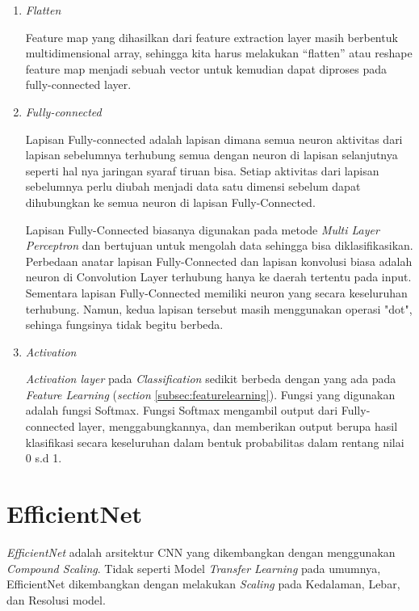\begin{enumerate}
	\item \textit{Flatten}
	
	Feature map yang dihasilkan dari feature extraction layer masih berbentuk multidimensional array, sehingga kita harus melakukan “flatten” atau reshape feature map menjadi sebuah vector untuk kemudian dapat diproses pada fully-connected layer.
	
	\item \textit{Fully-connected}
	
	Lapisan Fully-connected adalah lapisan dimana semua neuron aktivitas dari lapisan sebelumnya terhubung semua dengan neuron di lapisan selanjutnya seperti hal nya jaringan syaraf tiruan bisa. Setiap aktivitas dari lapisan sebelumnya perlu diubah menjadi data satu dimensi sebelum dapat dihubungkan ke semua neuron di lapisan Fully-Connected.
	
	Lapisan Fully-Connected biasanya digunakan pada metode \textit{Multi Layer Perceptron} dan bertujuan untuk mengolah data sehingga bisa diklasifikasikan. Perbedaan anatar lapisan Fully-Connected dan lapisan konvolusi biasa adalah neuron di Convolution Layer terhubung hanya ke daerah tertentu pada input. Sementara lapisan Fully-Connected memiliki neuron yang secara keseluruhan terhubung. Namun, kedua lapisan tersebut masih menggunakan operasi "dot", sehinga fungsinya tidak begitu berbeda.
	
	\item \textit{Activation}
	
	\textit{Activation layer} pada \textit{Classification} sedikit berbeda dengan yang ada pada \textit{Feature Learning} (\textit{section} \ref{subsec:featurelearning}). Fungsi yang digunakan adalah fungsi Softmax. Fungsi Softmax mengambil output dari Fully-connected layer, menggabungkannya, dan memberikan output berupa hasil klasifikasi secara keseluruhan dalam bentuk probabilitas dalam rentang nilai 0 s.d 1.
	
\end{enumerate}

\vspace{2ex}
\section{EfficientNet}
\label{sec:effnet}

\textit{EfficientNet} adalah arsitektur CNN yang dikembangkan dengan menggunakan \textit{Compound Scaling}. Tidak seperti Model \textit{Transfer Learning} pada umumnya, EfficientNet dikembangkan dengan melakukan \textit{Scaling} pada Kedalaman, Lebar, dan Resolusi model. \cite{cit:effnet}

